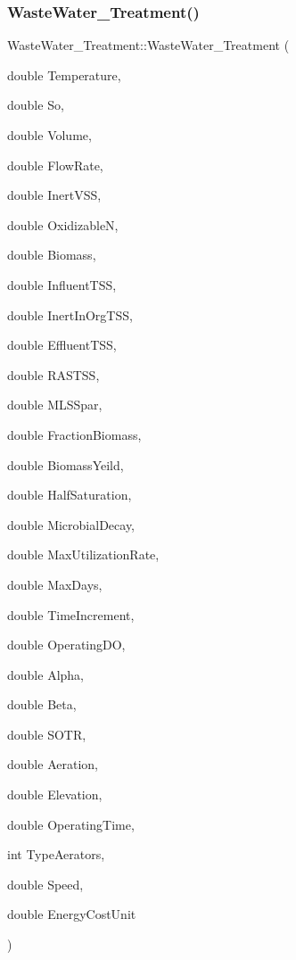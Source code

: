\subsubsection{\texorpdfstring{Waste\+Water\+\_\+\+Treatment()}{WasteWater\_Treatment()}\hspace{0.1cm}{\footnotesize\ttfamily [1/3]}}
{\footnotesize\ttfamily Waste\+Water\+\_\+\+Treatment\+::\+Waste\+Water\+\_\+\+Treatment (\begin{DoxyParamCaption}\item[{double}]{Temperature,  }\item[{double}]{So,  }\item[{double}]{Volume,  }\item[{double}]{Flow\+Rate,  }\item[{double}]{Inert\+V\+SS,  }\item[{double}]{OxidizableN,  }\item[{double}]{Biomass,  }\item[{double}]{Influent\+T\+SS,  }\item[{double}]{Inert\+In\+Org\+T\+SS,  }\item[{double}]{Effluent\+T\+SS,  }\item[{double}]{R\+A\+S\+T\+SS,  }\item[{double}]{M\+L\+S\+Spar,  }\item[{double}]{Fraction\+Biomass,  }\item[{double}]{Biomass\+Yeild,  }\item[{double}]{Half\+Saturation,  }\item[{double}]{Microbial\+Decay,  }\item[{double}]{Max\+Utilization\+Rate,  }\item[{double}]{Max\+Days,  }\item[{double}]{Time\+Increment,  }\item[{double}]{Operating\+DO,  }\item[{double}]{Alpha,  }\item[{double}]{Beta,  }\item[{double}]{S\+O\+TR,  }\item[{double}]{Aeration,  }\item[{double}]{Elevation,  }\item[{double}]{Operating\+Time,  }\item[{int}]{Type\+Aerators,  }\item[{double}]{Speed,  }\item[{double}]{Energy\+Cost\+Unit }\end{DoxyParamCaption})\hspace{0.3cm}{\ttfamily [inline]}}


